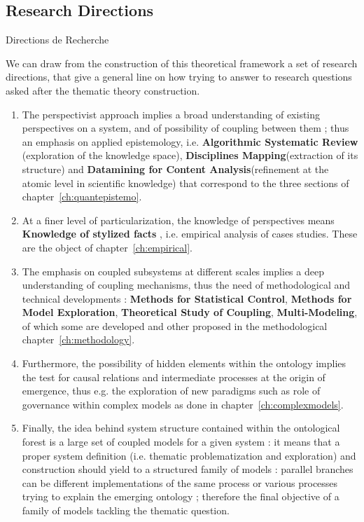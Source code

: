 \subsection{Research Directions}{Directions de Recherche}

We can draw from the construction of this theoretical framework a set of research directions, that give a general line on how trying to answer to research questions asked after the thematic theory construction.

\begin{enumerate}
\item The perspectivist approach implies a broad understanding of existing perspectives on a system, and of possibility of coupling between them ; thus an emphasis on applied epistemology, i.e. \textbf{Algorithmic Systematic Review} (exploration of the knowledge space), \textbf{Disciplines Mapping}(extraction of its structure) and \textbf{Datamining for Content Analysis}(refinement at the atomic level in scientific knowledge) that correspond to the three sections of chapter~\ref{ch:quantepistemo}.
\item At a finer level of particularization, the knowledge of perspectives means \textbf{Knowledge of stylized facts} 
, i.e. empirical analysis of cases studies. These are the object of chapter~\ref{ch:empirical}.
\item The emphasis on coupled subsystems at different scales implies a deep understanding of coupling mechanisms, thus the need of methodological and technical developments : \textbf{Methods for Statistical Control}, \textbf{Methods for Model Exploration}, \textbf{Theoretical Study of Coupling}, \textbf{Multi-Modeling}, of which some are developed and other proposed in the methodological chapter~\ref{ch:methodology}.
\item Furthermore, the possibility of hidden elements within the ontology implies the test for causal relations and intermediate processes at the origin of emergence, thus e.g. the exploration of new paradigms such as role of governance within complex models as done in chapter~\ref{ch:complexmodels}.
\item Finally, the idea behind system structure contained within the ontological forest is a large set of coupled models for a given system : it means that a proper system definition (i.e. thematic problematization and exploration) and construction should yield to a structured family of models : parallel branches can be different implementations of the same process or various processes trying to explain the emerging ontology ; therefore the final objective of a family of models tackling the thematic question.
\end{enumerate}










